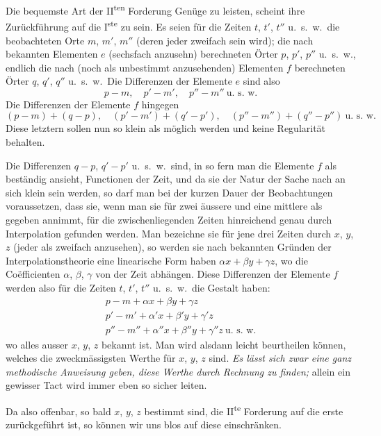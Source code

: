 %
Die bequemste Art der II\textsuperscript{ten} Forderung Genüge zu leisten, scheint ihre Zurückführung auf die I\textsuperscript{ste} zu sein. Es seien für die Zeiten $t$, $t'$, $t''$ u.\ s.\ w.\ die beobachteten Orte $m$, $m'$, $m''$ (deren jeder zweifach sein wird); die nach bekannten Elementen $e$ (sechsfach anzusehn) berechneten Örter $p$, $p'$, $p''$ u.\ s.\ w., endlich die nach (noch als unbestimmt anzusehenden) Elementen $f$ berechneten Örter $q$, $q'$, $q''$ u.\ s.\ w.\ Die Differenzen der Elemente $e$ sind also
\[
p-m,\quad p'-m',\quad p''-m''\ \text{u.\ s.\ w.}
\]
Die Differenzen der Elemente $f$ hingegen
\[
(p-m)+(q-p),\quad(p'-m')+(q'-p'),\quad(p''-m'')+(q''-p'')\ \text{u.\ s.\ w.}
\]
Diese letztern sollen nun so klein als möglich werden und keine Regularität behalten.

Die Differenzen $q-p$, $q'-p'$ u.\ s.\ w.\ sind, in so fern man die Elemente $f$ als beständig ansieht, Functionen der Zeit, und da sie der Natur der Sache nach an sich klein sein werden, so darf man bei der kurzen Dauer der Beobachtungen voraussetzen, dass sie, wenn man sie für zwei äussere und eine mittlere als gegeben annimmt, für die zwischenliegenden Zeiten hinreichend genau durch Interpolation gefunden werden. Man bezeichne sie für jene drei Zeiten durch $x$, $y$, $z$ (jeder als zweifach anzusehen), so werden sie nach bekannten Gründen der Interpolationstheorie eine linearische Form haben $\alpha x+\beta y+\gamma z$, wo die Coëfficienten $\alpha$, $\beta$, $\gamma$ von der Zeit abhängen. Diese Differenzen der Elemente $f$ werden also für die Zeiten $t$, $t'$, $t''$ u.\ s.\ w.\ die Gestalt haben:
\[
\begin{gathered}
p-m+\alpha x+\beta y+\gamma z\\
p'-m'+\alpha'x+\beta'y+\gamma'z\\
p''-m''+\alpha''x+\beta''y+\gamma''z\ \text{u.\ s.\ w.}
\end{gathered}
\]
wo alles ausser $x$, $y$, $z$ bekannt ist. Man wird alsdann leicht beurtheilen können, welches die zweckmässigsten Werthe für $x$, $y$, $z$ sind. \emph{Es lässt sich zwar eine ganz methodische Anweisung geben, diese Werthe durch Rechnung zu finden;} allein ein gewisser Tact wird immer eben so sicher leiten.

Da also offenbar, so bald $x$, $y$, $z$ bestimmt sind, die II\textsuperscript{te} Forderung auf die erste zurückgeführt ist, so können wir uns blos auf diese einschränken.

